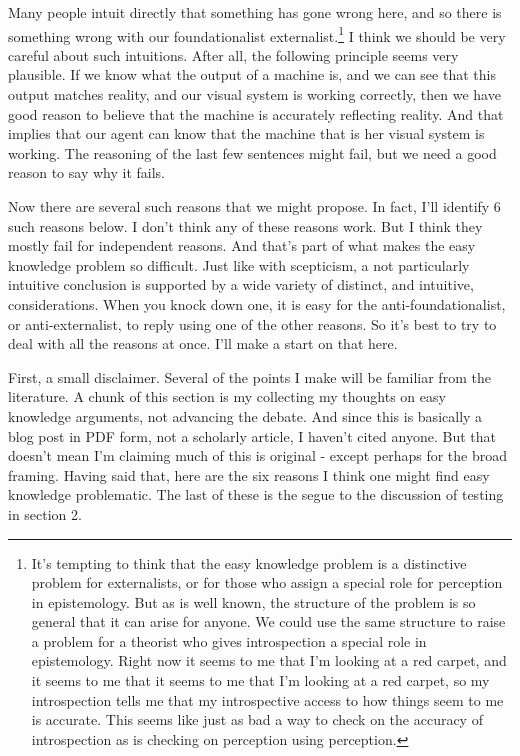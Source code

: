 Many people intuit directly that something has gone wrong here, and so there is something wrong with our foundationalist externalist.\footnote{It's tempting to think that the easy knowledge problem is a distinctive problem for externalists, or for those who assign a special role for perception in epistemology. But as is well known, the structure of the problem is so general that it can arise for anyone. We could use the same structure to raise a problem for a theorist who gives introspection a special role in epistemology. Right now it seems to me that I'm looking at a red carpet, and it seems to me that it seems to me that I'm looking at a red carpet, so my introspection tells me that my introspective access to how things seem to me is accurate. This seems like just as bad a way to check on the accuracy of introspection as is checking on perception using perception.} I think we should be very careful about such intuitions. After all, the following principle seems very plausible. If we know what the output of a machine is, and we can see that this output matches reality, and our visual system is working correctly, then we have good reason to believe that the machine is accurately reflecting reality. And that implies that our agent can know that the machine that is her visual system is working. The reasoning of the last few sentences might fail, but we need a good reason to say why it fails.

Now there are several such reasons that we might propose. In fact, I'll identify 6 such reasons below. I don't think any of these reasons work. But I think they mostly fail for independent reasons. And that's part of what makes the easy knowledge problem so difficult. Just like with scepticism, a not particularly intuitive conclusion is supported by a wide variety of distinct, and intuitive, considerations. When you knock down one, it is easy for the anti-foundationalist, or anti-externalist, to reply using one of the other reasons. So it's best to try to deal with all the reasons at once. I'll make a start on that here. 

First, a small disclaimer. Several of the points I make will be familiar from the literature. A chunk of this section is my collecting my thoughts on easy knowledge arguments, not advancing the debate. And since this is basically a blog post in PDF form, not a scholarly article, I haven't cited anyone. But that doesn't mean I'm claiming much of this is original - except perhaps for the broad framing. Having said that, here are the six reasons I think one might find easy knowledge problematic. The last of these is the segue to the discussion of testing in section 2.

